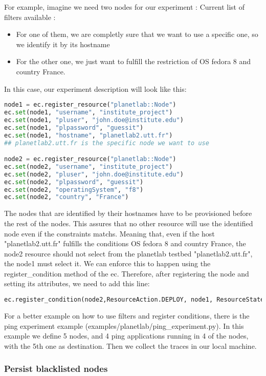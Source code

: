 For example, imagine we need two nodes for our experiment :
Current list of filters available :
\begin{itemize}
  \item For one of them, we are completly sure that we want to use a specific one, so we identify it by its hostname
  \item For the other one, we just want to fulfill the restriction of OS fedora 8 and country France.
\end{itemize}

In this case, our experiment description will look like this:
\begin{lstlisting}[language=Python]
node1 = ec.register_resource("planetlab::Node")
ec.set(node1, "username", "institute_project")
ec.set(node1, "pluser", "​​john.doe@institute.edu")
ec.set(node1, "plpassword", "guessit")
ec.set(node1, "hostname", "planetlab2.utt.fr") 
## planetlab2.utt.fr is the specific node we want to use

node2 = ec.register_resource("planetlab::Node")
ec.set(node2, "username", "institute_project")
ec.set(node2, "pluser", "​​john.doe@institute.edu")
ec.set(node2, "plpassword", "guessit")
ec.set(node2, "operatingSystem", "f8")
ec.set(node2, "country", "France")
\end{lstlisting}
The nodes that are identified by their hostnames have to be provisioned before the rest of the nodes. This assures that no other resource will use the identified node even if the constraints matchs. Meaning that, even if the host "planetlab2.utt.fr" fulfills the conditions OS fedora 8 and country France, the node2 resource should not select from the planetlab testbed "planetlab2.utt.fr", the node1 must select it. We can enforce this to happen using the register\_condition method of the ec. Therefore, after registering the node and setting its attributes, we need to add this line:
\begin{lstlisting}[language=Python]
ec.register_condition(node2,ResourceAction.DEPLOY, node1, ResourceState.PROVISIONED)
\end{lstlisting}
For a better example on how to use filters and register conditions, there is the ping experiment example (examples/planetlab/ping\_experiment.py). In this example we define 5 nodes, and 4 ping applications running in 4 of the nodes, with the 5th one as destination. Then we collect the traces in our local machine.


\subsubsection{Persist blacklisted nodes}

